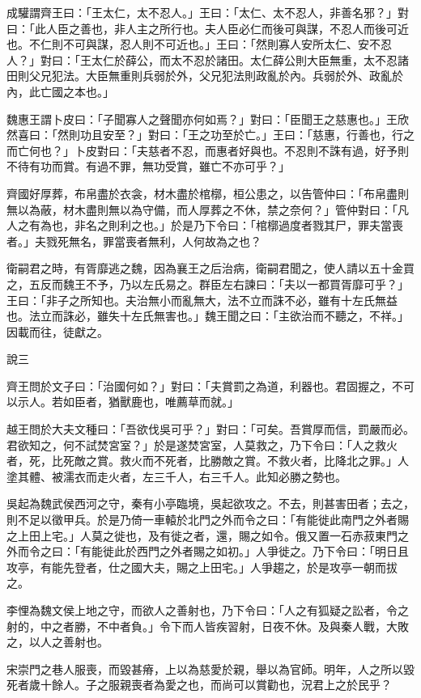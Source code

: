 \begin{pinyinscope}
成驩謂齊王曰：「王太仁，太不忍人。」王曰：「太仁、太不忍人，非善名邪？」對曰：「此人臣之善也，非人主之所行也。夫人臣必仁而後可與謀，不忍人而後可近也。不仁則不可與謀，忍人則不可近也。」王曰：「然則寡人安所太仁、安不忍人？」對曰：「王太仁於薛公，而太不忍於諸田。太仁薛公則大臣無重，太不忍諸田則父兄犯法。大臣無重則兵弱於外，父兄犯法則政亂於內。兵弱於外、政亂於內，此亡國之本也。」

魏惠王謂卜皮曰：「子聞寡人之聲聞亦何如焉？」對曰：「臣聞王之慈惠也。」王欣然喜曰：「然則功且安至？」對曰：「王之功至於亡。」王曰：「慈惠，行善也，行之而亡何也？」卜皮對曰：「夫慈者不忍，而惠者好與也。不忍則不誅有過，好予則不待有功而賞。有過不罪，無功受賞，雖亡不亦可乎？」

齊國好厚葬，布帛盡於衣衾，材木盡於棺槨，桓公患之，以告管仲曰：「布帛盡則無以為蔽，材木盡則無以為守備，而人厚葬之不休，禁之奈何？」管仲對曰：「凡人之有為也，非名之則利之也。」於是乃下令曰：「棺槨過度者戮其尸，罪夫當喪者。」夫戮死無名，罪當喪者無利，人何故為之也？

衛嗣君之時，有胥靡逃之魏，因為襄王之后治病，衛嗣君聞之，使人請以五十金買之，五反而魏王不予，乃以左氏易之。群臣左右諫曰：「夫以一都買胥靡可乎？」王曰：「非子之所知也。夫治無小而亂無大，法不立而誅不必，雖有十左氏無益也。法立而誅必，雖失十左氏無害也。」魏王聞之曰：「主欲治而不聽之，不祥。」因載而往，徒獻之。

說三

齊王問於文子曰：「治國何如？」對曰：「夫賞罰之為道，利器也。君固握之，不可以示人。若如臣者，猶獸鹿也，唯薦草而就。」

越王問於大夫文種曰：「吾欲伐吳可乎？」對曰：「可矣。吾賞厚而信，罰嚴而必。君欲知之，何不試焚宮室？」於是遂焚宮室，人莫救之，乃下令曰：「人之救火者，死，比死敵之賞。救火而不死者，比勝敵之賞。不救火者，比降北之罪。」人塗其體、被濡衣而走火者，左三千人，右三千人。此知必勝之勢也。

吳起為魏武侯西河之守，秦有小亭臨境，吳起欲攻之。不去，則甚害田者；去之，則不足以徵甲兵。於是乃倚一車轅於北門之外而令之曰：「有能徙此南門之外者賜之上田上宅。」人莫之徙也，及有徙之者，還，賜之如令。俄又置一石赤菽東門之外而令之曰：「有能徙此於西門之外者賜之如初。」人爭徙之。乃下令曰：「明日且攻亭，有能先登者，仕之國大夫，賜之上田宅。」人爭趨之，於是攻亭一朝而拔之。

李悝為魏文侯上地之守，而欲人之善射也，乃下令曰：「人之有狐疑之訟者，令之射的，中之者勝，不中者負。」令下而人皆疾習射，日夜不休。及與秦人戰，大敗之，以人之善射也。

宋崇門之巷人服喪，而毀甚瘠，上以為慈愛於親，舉以為官師。明年，人之所以毀死者歲十餘人。子之服親喪者為愛之也，而尚可以賞勸也，況君上之於民乎？


\end{pinyinscope}
